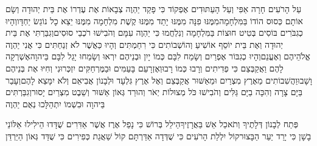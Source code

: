 \documentclass[../main/main.tex]{subfiles}
\begin{document}
\begin{multicols*}{\ncols}
עַל הָרֹעִים חָרָה אַפִּי וְעַל הָעַתּוּדִים אֶפְקוֹד כִּי פָקַד יַהְוֶה צְבָאוֹת אֶת עֶדְרוֹ אֶת בֵּית יְהוּדָה וְשָׂם אוֹתָם כְּסוּס הוֹדוֹ בַּמִּלְחָמָה\PreVerseSpace{}מִמֶּנּוּ פִנָּה מִמֶּנּוּ יָתֵד מִמֶּנּוּ קֶשֶׁת מִלְחָמָה מִמֶּנּוּ יֵצֵא כָל נוֹגֵשׂ יַחְדָּו\PreVerseSpace{}וְהָיוּ כְגִבֹּרִים בּוֹסִים בְּטִיט חוּצוֹת בַּמִּלְחָמָה וְנִלְחֲמוּ כִּי יַהְוֶה עִמָּם וְהֹבִישׁוּ רֹכְבֵי סוּסִים\PreVerseSpace{}וְגִבַּרְתִּי אֶת בֵּית יְהוּדָה וְאֶת בֵּית יוֹסֵף אוֹשִׁיעַ וְהוֹשְׁבוֹתִים כִּי רִחַמְתִּים וְהָיוּ כַּאֲשֶׁר לֹא זְנַחְתִּים כִּי אֲנִי יַהְוֶה אֱלֹהֵיהֶם וְאֶעֱנֵם\PreVerseSpace{}וְהָיוּ כְגִבּוֹר אֶפְרַיִם וְשָׂמַח לִבָּם כְּמוֹ יָיִן וּבְנֵיהֶם יִרְאוּ וְשָׂמֵחוּ יָגֵל לִבָּם בַּיהוָה\PreVerseSpace{}אֶשְׁרְקָה לָהֶם וַאֲקַבְּצֵם כִּי פְדִיתִים וְרָבוּ כְּמוֹ רָבוּ\PreVerseSpace{}וְאֶזְרָעֵם בָּעַמִּים וּבַמֶּרְחַקִּים יִזְכְּרוּנִי וְחִיּוּ\SubEnd{} אֶת בְּנֵיהֶם וָשָׁבוּ\PreVerseSpace{}וַהֲשִׁבוֹתִים מֵאֶרֶץ מִצְרַיִם וּמֵאַשּׁוּר אֲקַבְּצֵם וְאֶל אֶרֶץ גִּלְעָד וּלְבָנוֹן אֲבִיאֵם וְלֹא יִמָּצֵא לָהֶם\PreVerseSpace{}וְעָבַר בַּיָּם צָרָה וְהִכָּה בַיָּם גַּלִּים וְהֹבִישׁוּ כֹּל מְצוּלוֹת יְאֹר וְהוּרַד גְּאוֹן אַשּׁוּר וְשֵׁבֶט מִצְרַיִם יָסוּר\PreVerseSpace{}וְגִבַּרְתִּים בַּיהוָה וּבִשְׁמוֹ יִתְהַלָּכוּ נְאֻם יַהְוֶה\OpenSection{}\par
{}פְּתַח לְבָנוֹן דְּלָתֶיךָ וְתֹאכַל אֵשׁ בַּאֲרָזֶיךָ\PreVerseSpace{}הֵילֵל בְּרוֹשׁ כִּי נָפַל אֶרֶז אֲשֶׁר אַדִּרִים שֻׁדָּדוּ הֵילִילוּ אַלּוֹנֵי בָשָׁן כִּי יָרַד יַעַר הַבָּצוּר\PreVerseSpace{}קוֹל יִלְלַת הָרֹעִים כִּי שֻׁדְּדָה אַדַּרְתָּם קוֹל שַׁאֲגַת כְּפִירִים כִּי שֻׁדַּד גְּאוֹן הַיַּרְדֵּן\OpenSection{}\par

\end{multicols*}
\end{document}
